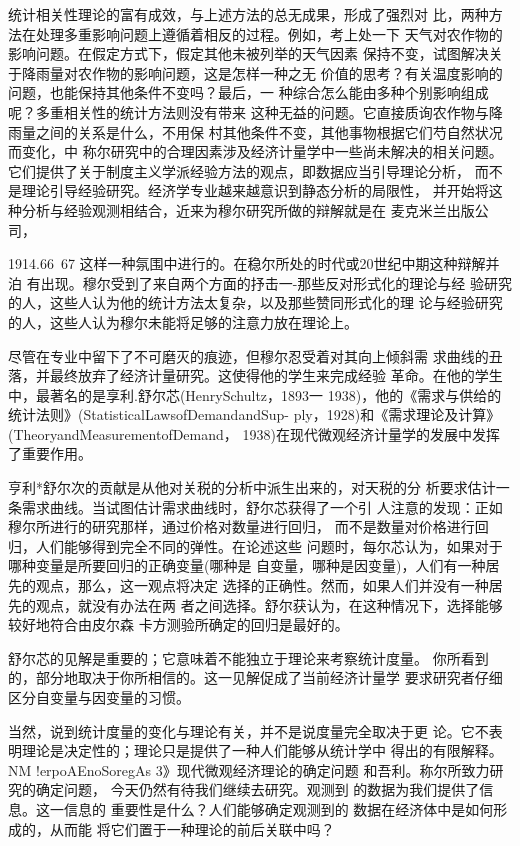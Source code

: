 统计相关性理论的富有成效，与上述方法的总无成果，形成了强烈对
比，两种方法在处理多重影响问题上遵循着相反的过程。例如，考上处一下
天气对农作物的影响问题。在假定方式下，假定其他未被列举的天气因素
保持不变，试图解决关于降雨量对农作物的影响问题，这是怎样一种之无
价值的思考？有关温度影响的问题，也能保持其他条件不变吗？最后，一
种综合怎么能由多种个别影响组成呢？多重相关性的统计方法则没有带来
这种无益的问题。它直接质询农作物与降雨量之间的关系是什么，不用保
村其他条件不变，其他事物根据它们芍自然状况而变化，中
称尔研究中的合理因素涉及经济计量学中一些尚未解决的相关问题。
它们提供了关于制度主义学派经验方法的观点，即数据应当引导理论分析，
而不是理论引导经验研究。经济学专业越来越意识到静态分析的局限性，
并开始将这种分析与经验观测相结合，近来为穆尔研究所做的辩解就是在
麦克米兰出版公司，

1914.66~67
这样一种氛围中进行的。在稳尔所处的时代或20世纪中期这种辩解并泊
有出现。穆尔受到了来自两个方面的抒击一-那些反对形式化的理论与经
验研究的人，这些人认为他的统计方法太复杂，以及那些赞同形式化的理
论与经验研究的人，这些人认为穆尔未能将足够的注意力放在理论上。

尽管在专业中留下了不可磨灭的痕迹，但穆尔忍受着对其向上倾斜需
求曲线的丑落，并最终放弃了经济计量研究。这使得他的学生来完成经验
革命。在他的学生中，最著名的是享利.舒尔芯(HenrySchultz，1893一
1938)，他的《需求与供给的统计法则》(StatisticalLawsofDemandandSup-
ply，1928)和《需求理论及计算》(TheoryandMeasurementofDemand，
1938)在现代微观经济计量学的发展中发挥了重要作用。


亨利*舒尔次的贡献是从他对关税的分析中派生出来的，对天税的分
析要求估计一条需求曲线。当试图估计需求曲线时，舒尔芯获得了一个引
人注意的发现：正如穆尔所进行的研究那样，通过价格对数量进行回归，
而不是数量对价格进行回归，人们能够得到完全不同的弹性。在论述这些
问题时，每尔芯认为，如果对于哪种变量是所要回归的正确变量(哪种是
自变量，哪种是因变量)，人们有一种居先的观点，那么，这一观点将决定
选择的正确性。然而，如果人们并没有一种居先的观点，就没有办法在两
者之间选择。舒尔获认为，在这种情况下，选择能够较好地符合由皮尔森
卡方测验所确定的回归是最好的。

舒尔芯的见解是重要的；它意味着不能独立于理论来考察统计度量。
你所看到的，部分地取决于你所相信的。这一见解促成了当前经济计量学
要求研究者仔细区分自变量与因变量的习惯。

当然，说到统计度量的变化与理论有关，并不是说度量完全取决于更
论。它不表明理论是决定性的；理论只是提供了一种人们能够从统计学中
得出的有限解释。
NM
!erpoAEnoSoregAs
3》现代微观经济理论的确定问题
和吾利。称尔所致力研究的确定问题，
今天仍然有待我们继续去研究。观测到
的数据为我们提供了信息。这一信息的
重要性是什么？人们能够确定观测到的
数据在经济体中是如何形成的，从而能
将它们置于一种理论的前后关联中吗？

